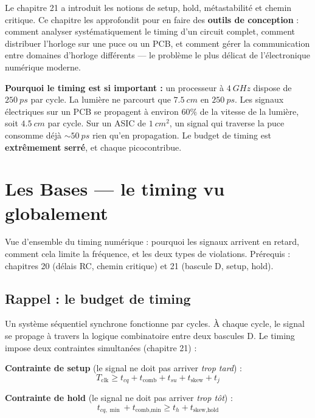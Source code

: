 \documentclass[12pt,a4paper,twoside]{book}
\begin{document}
\vspace{0.5cm}

Le chapitre 21 a introduit les notions de setup, hold, métastabilité et chemin critique. Ce chapitre les approfondit pour en faire des \textbf{outils de conception} : comment analyser systématiquement le timing d'un circuit complet, comment distribuer l'horloge sur une puce ou un PCB, et comment gérer la communication entre domaines d'horloge différents --- le problème le plus délicat de l'électronique numérique moderne.

\begin{intuition}
\textbf{Pourquoi le timing est si important :} un processeur à $\SI{4}{GHz}$ dispose de $\SI{250}{ps}$ par cycle. La lumière ne parcourt que $\SI{7.5}{cm}$ en $\SI{250}{ps}$. Les signaux électriques sur un PCB se propagent à environ $60\%$ de la vitesse de la lumière, soit $\SI{4.5}{cm}$ par cycle. Sur un ASIC de $\SI{1}{cm^2}$, un signal qui traverse la puce consomme déjà $\sim\SI{50}{ps}$ rien qu'en propagation. Le budget de timing est \textbf{extrêmement serré}, et chaque picocontribue.
\end{intuition}

\section{Les Bases --- le timing vu globalement}

\begin{bases}
Vue d'ensemble du timing numérique : pourquoi les signaux arrivent en retard, comment cela limite la fréquence, et les deux types de violations. Prérequis : chapitres 20 (délais RC, chemin critique) et 21 (bascule D, setup, hold).
\end{bases}

\subsection{Rappel : le budget de timing}

Un système séquentiel synchrone fonctionne par cycles. À chaque cycle, le signal se propage à travers la logique combinatoire entre deux bascules D. Le timing impose deux contraintes simultanées (chapitre 21) :

\begin{formule}
\textbf{Contrainte de setup} (le signal ne doit pas arriver \textit{trop tard}) :
\[
\boxed{T_{\text{clk}} \geq t_{cq} + t_{\text{comb}} + t_{su} + t_{\text{skew}} + t_j}
\]

\textbf{Contrainte de hold} (le signal ne doit pas arriver \textit{trop tôt}) :
\[
\boxed{t_{cq,\min} + t_{\text{comb,min}} \geq t_h + t_{\text{skew,hold}}}
\]
\end{formule}
\end{document}
